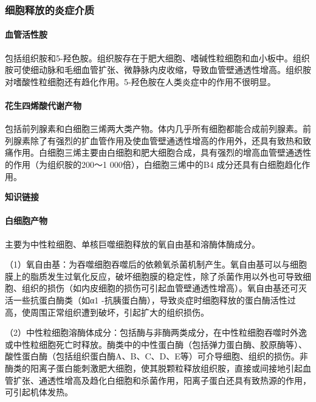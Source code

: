 \subsubsection{细胞释放的炎症介质}

\paragraph{血管活性胺}
包括组织胺和5-羟色胺。组织胺存在于肥大细胞、嗜碱性粒细胞和血小板中。组织胺可使细动脉和毛细血管扩张、微静脉内皮收缩，导致血管壁通透性增高。组织胺对嗜酸性粒细胞还有趋化作用。5-羟色胺在人类炎症中的作用不很明显。

\paragraph{花生四烯酸代谢产物}
包括前列腺素和白细胞三烯两大类产物。体内几乎所有细胞都能合成前列腺素。前列腺素除了有强烈的扩血管作用及使血管壁通透性增高的作用外，还具有致热和致痛作用。白细胞三烯主要由白细胞和肥大细胞合成，具有强烈的增高血管壁通透性的作用（为组织胺的200～1
000倍），白细胞三烯中的B{4} 成分还具有白细胞趋化作用。

\begin{center}
  \textbf{知识链接}
\end{center}

\paragraph{白细胞产物}
主要为中性粒细胞、单核巨噬细胞释放的氧自由基和溶酶体酶成分。

（1）氧自由基：为吞噬细胞吞噬后的依赖氧杀菌机制产生。氧自由基可以与细胞膜上的脂质发生过氧化反应，破坏细胞膜的稳定性，除了杀菌作用以外也可导致细胞、组织的损伤（如内皮细胞的损伤可引起血管壁通透性增高）。氧自由基还可灭活一些抗蛋白酶类（如α{1}
-抗胰蛋白酶），导致炎症时细胞释放的蛋白酶活性过高，使周围正常组织遭到破坏，引起扩大的组织损伤。

（2）中性粒细胞溶酶体成分：包括酶与非酶两类成分，在中性粒细胞吞噬时外逸或中性粒细胞死亡时释放。酶类中的中性蛋白酶（包括弹力蛋白酶、胶原酶等）、酸性蛋白酶（包括组织蛋白酶A、B、C、D、E等）可介导细胞、组织的损伤。非酶类的阳离子蛋白能刺激肥大细胞，使其脱颗粒释放组织胺，直接或间接地引起血管扩张、通透性增高及趋化白细胞和杀菌作用，阳离子蛋白还具有致热源的作用，可引起机体发热。


